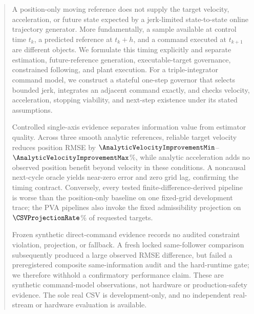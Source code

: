 \begin{abstract}
A position-only moving reference does not supply the target velocity,
acceleration, or future state expected by a jerk-limited state-to-state online
trajectory generator.  More fundamentally, a sample available at control
time \(t_k\), a predicted reference at \(t_k+h\), and a command executed at
\(t_{k+1}\) are different objects.  We formulate this timing explicitly and
separate estimation, future-reference generation, executable-target
governance, constrained following, and plant execution.  For a
triple-integrator command model, we construct a stateful one-step governor
that selects bounded jerk, integrates an adjacent command exactly, and checks
velocity, acceleration, stopping viability, and next-step existence under its
stated assumptions.

Controlled single-axis evidence separates information value from estimator
quality.  Across three smooth analytic references, reliable target velocity
reduces position RMSE by \(\AnalyticVelocityImprovementMin\)--%
\(\AnalyticVelocityImprovementMax\)\%, while analytic acceleration adds no
observed position benefit beyond velocity in these conditions.  A noncausal
next-cycle oracle yields near-zero error and zero grid lag, confirming the
timing contract.  Conversely, every tested finite-difference-derived pipeline
is worse than the position-only baseline on one fixed-grid development trace;
the PVA pipelines also invoke the fixed admissibility projection on
\(\CSVProjectionRate\)\% of requested targets.

Frozen synthetic direct-command evidence records no audited constraint
violation, projection, or fallback.  A fresh locked same-follower comparison
subsequently produced a large observed RMSE difference, but failed a
preregistered composite same-information audit and the hard-runtime gate; we
therefore withhold a confirmatory performance claim.  These are synthetic
command-model observations, not hardware or production-safety evidence.  The
sole real CSV is development-only, and no independent real-stream or hardware
evaluation is available.
\end{abstract}
